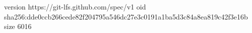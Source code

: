 version https://git-lfs.github.com/spec/v1
oid sha256:dde0ccb266cede82f204795a546dc27e3c0191a1ba5d3c84a8ea819c42f3e16b
size 6016

